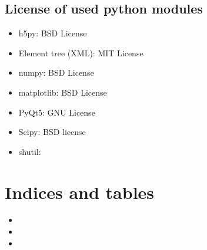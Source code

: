 \documentclass[letterpaper,10pt,english]{sphinxmanual}
\begin{document}
\section{License of used python modules}
\label{\detokenize{index:license-of-used-python-modules}}\begin{itemize}
\item {} 
h5py: BSD License

\item {} 
Element tree (XML): MIT License

\item {} 
numpy: BSD License

\item {} 
matplotlib: BSD License

\item {} 
PyQt5: GNU License

\item {} 
Scipy: BSD license

\item {} 
shutil:

\end{itemize}


\chapter{Indices and tables}
\label{\detokenize{index:indices-and-tables}}\begin{itemize}
\item {} 

\item {} 

\item {} 

\end{itemize}
\end{document}
